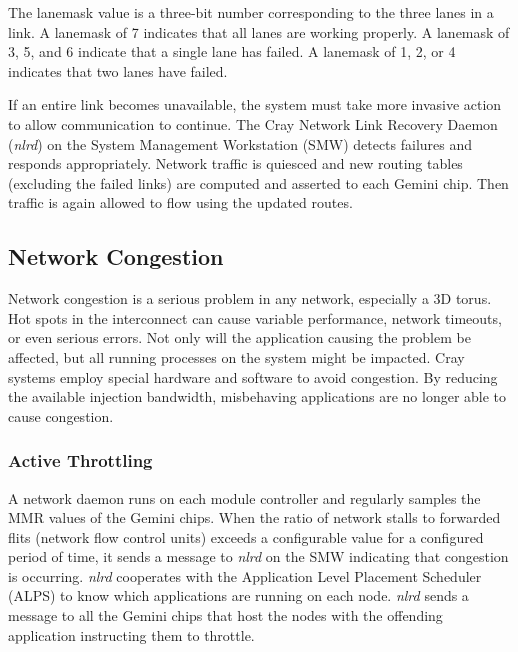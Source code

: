 \documentclass[10pt, conference, compsocconf]{IEEEtran}
\begin{document}

The lanemask value is a three-bit number corresponding to the three lanes in a
link.  A lanemask of 7 indicates that all lanes are working properly.  A
lanemask of 3, 5, and 6 indicate that a single lane has failed.  A lanemask of
1, 2, or 4 indicates that two lanes have failed.

If an entire link becomes unavailable, the system must take more invasive
action to allow communication to continue.  The Cray Network Link Recovery
Daemon (\emph{nlrd}) on the System Management Workstation (SMW) detects failures and
responds appropriately.  Network traffic is quiesced and new routing tables
(excluding the failed links) are computed and asserted to each Gemini chip.
Then traffic is again allowed to flow using the updated routes.

\subsection{Network Congestion}

Network congestion is a serious problem in any network, especially a 3D torus.
Hot spots in the interconnect can cause variable performance, network timeouts,
or even serious errors.  Not only will the application causing the problem be
affected, but all running processes on the system might be impacted.  Cray
systems employ special hardware and software to avoid congestion.  By reducing
the available injection bandwidth, misbehaving applications are no longer able
to cause congestion.

\subsubsection{Active Throttling}

A network daemon runs on each module controller and regularly samples the MMR
values of the Gemini chips.  When the ratio of network stalls to forwarded
flits (network flow control units) exceeds a configurable value for a
configured period of time, it sends a message to \emph{nlrd} on the SMW indicating
that congestion is occurring.  \emph{nlrd} cooperates with the Application Level
Placement Scheduler (ALPS) to know which applications are running on each node.
\emph{nlrd} sends a message to all the Gemini chips that host the nodes with the
offending application instructing them to throttle.
\end{document}
